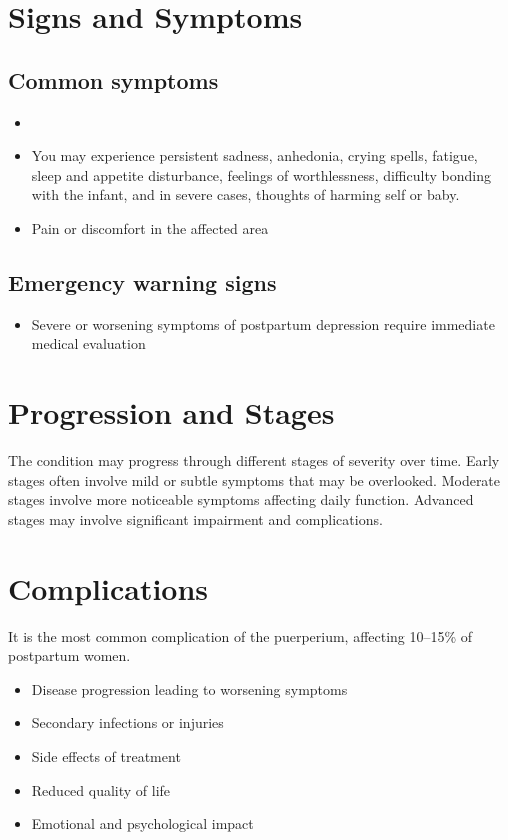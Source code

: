 \section{Signs and Symptoms}
\subsection{Common symptoms}
\begin{itemize}[noitemsep]
  \item \item You may experience persistent sadness, anhedonia, crying spells, fatigue, sleep and appetite disturbance, feelings of worthlessness, difficulty bonding with the infant, and in severe cases, thoughts of harming self or baby.
  \item Pain or discomfort in the affected area
  \end{itemize}
\subsection{Emergency warning signs}
\begin{itemize}[noitemsep]
  \item Severe or worsening symptoms of postpartum depression require immediate medical evaluation
\end{itemize}
\section{Progression and Stages}
The condition may progress through different stages of severity over time. Early stages often involve mild or subtle symptoms that may be overlooked. Moderate stages involve more noticeable symptoms affecting daily function. Advanced stages may involve significant impairment and complications.
\section{Complications}
It is the most common complication of the puerperium, affecting 10--15\% of postpartum women.

\begin{itemize}[noitemsep]
  \item Disease progression leading to worsening symptoms
  \item Secondary infections or injuries
  \item Side effects of treatment
  \item Reduced quality of life
  \item Emotional and psychological impact
\end{itemize}
